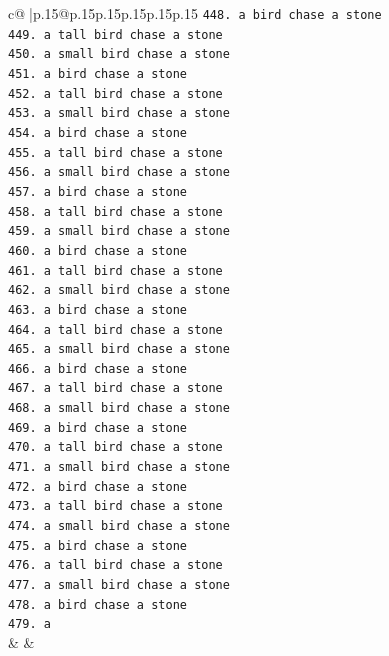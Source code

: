 \documentclass{article}
\begin{document}
{\begin{supertabular}{c@{$\;$}|p{.15\linewidth}@{}p{.15\linewidth}p{.15\linewidth}p{.15\linewidth}p{.15\linewidth}p{.15\linewidth}}
{{{\texttt{448. a bird chase a stone} \\
\texttt{449. a tall bird chase a stone} \\
\texttt{450. a small bird chase a stone} \\
\texttt{451. a bird chase a stone} \\
\texttt{452. a tall bird chase a stone} \\
\texttt{453. a small bird chase a stone} \\
\texttt{454. a bird chase a stone} \\
\texttt{455. a tall bird chase a stone} \\
\texttt{456. a small bird chase a stone} \\
\texttt{457. a bird chase a stone} \\
\texttt{458. a tall bird chase a stone} \\
\texttt{459. a small bird chase a stone} \\
\texttt{460. a bird chase a stone} \\
\texttt{461. a tall bird chase a stone} \\
\texttt{462. a small bird chase a stone} \\
\texttt{463. a bird chase a stone} \\
\texttt{464. a tall bird chase a stone} \\
\texttt{465. a small bird chase a stone} \\
\texttt{466. a bird chase a stone} \\
\texttt{467. a tall bird chase a stone} \\
\texttt{468. a small bird chase a stone} \\
\texttt{469. a bird chase a stone} \\
\texttt{470. a tall bird chase a stone} \\
\texttt{471. a small bird chase a stone} \\
\texttt{472. a bird chase a stone} \\
\texttt{473. a tall bird chase a stone} \\
\texttt{474. a small bird chase a stone} \\
\texttt{475. a bird chase a stone} \\
\texttt{476. a tall bird chase a stone} \\
\texttt{477. a small bird chase a stone} \\
\texttt{478. a bird chase a stone} \\
\texttt{479. a} \\
            }
        }
    }
    & & \\ \\


\end{supertabular}}
\end{document}
